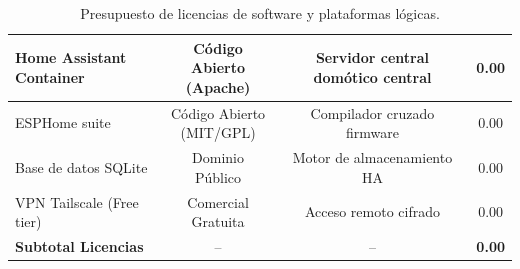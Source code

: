 \begin{table}[H]
\begin{tabular}{|l|c|c|c|}
        \parbox[c]{3.2cm}{\vspace{0.1cm}Home Assistant Container\vspace{0.1cm}}       & \parbox[c]{3.0cm}{\centering\vspace{0.1cm}Código Abierto\\(Apache)\vspace{0.1cm}}   & \parbox[c]{3.8cm}{\centering\vspace{0.15cm}Servidor central domótico central\vspace{0.15cm}}& 0.00 \\ \hline
        ESPHome suite                  & \parbox[c]{3.0cm}{\centering\vspace{0.1cm}Código Abierto\\(MIT/GPL)\vspace{0.1cm}}  & \parbox[c]{3.8cm}{\centering\vspace{0.15cm}Compilador cruzado firmware\vspace{0.15cm}}  & 0.00 \\ \hline
        \parbox[c]{3.2cm}{\vspace{0.1cm}Base de datos SQLite\vspace{0.1cm}}           & \parbox[c]{3.0cm}{\centering\vspace{0.1cm}Dominio Público\vspace{0.1cm}}           & \parbox[c]{3.8cm}{\centering\vspace{0.15cm}Motor de almacenamiento HA\vspace{0.15cm}}  & 0.00 \\ \hline
        \parbox[c]{3.2cm}{\vspace{0.1cm}VPN Tailscale (Free tier)\vspace{0.1cm}}      & \parbox[c]{3.0cm}{\centering\vspace{0.1cm}Comercial Gratuita\vspace{0.1cm}}        & \parbox[c]{3.8cm}{\centering\vspace{0.15cm}Acceso remoto cifrado\vspace{0.15cm}}       & 0.00 \\ \hline
        \parbox[c]{3.2cm}{\vspace{0.15cm}\textbf{Subtotal Licencias}\vspace{0.15cm}}    & --                        & --                          & \textbf{0.00} \\ \hline
    \end{tabular}
    \caption{Presupuesto de licencias de software y plataformas lógicas.}
    \label{tbl:presupuesto_software}
\end{table}

